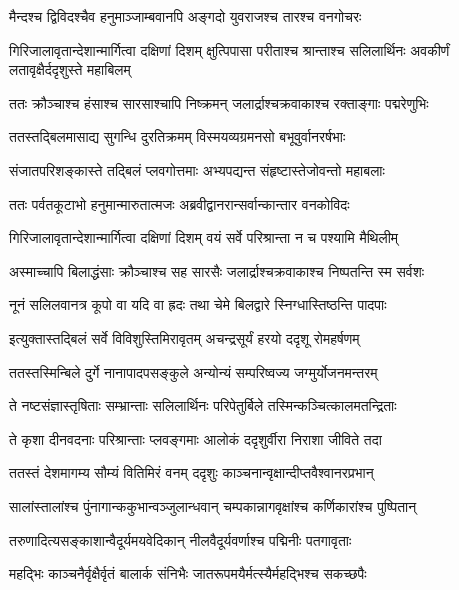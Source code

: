 \twolineshloka
{मैन्दश्च द्विविदश्चैव हनुमाञ्जाम्बवानपि}
{अङ्गदो युवराजश्च तारश्च वनगोचरः} %

\threelineshloka
{गिरिजालावृतान्देशान्मार्गित्वा दक्षिणां दिशम्}
{क्षुत्पिपासा परीताश्च श्रान्ताश्च सलिलार्थिनः}
{अवकीर्णं लतावृक्षैर्ददृशुस्ते महाबिलम्} %

\twolineshloka
{ततः क्रौञ्चाश्च हंसाश्च सारसाश्चापि निष्क्रमन्}
{जलार्द्राश्चक्रवाकाश्च रक्ताङ्गाः पद्मरेणुभिः} %

\twolineshloka
{ततस्तद्बिलमासाद्य सुगन्धि दुरतिक्रमम्}
{विस्मयव्यग्रमनसो बभूवुर्वानरर्षभाः} %

\twolineshloka
{संजातपरिशङ्कास्ते तद्बिलं प्लवगोत्तमाः}
{अभ्यपद्यन्त संहृष्टास्तेजोवन्तो महाबलाः} %

\twolineshloka
{ततः पर्वतकूटाभो हनुमान्मारुतात्मजः}
{अब्रवीद्वानरान्सर्वान्कान्तार वनकोविदः} %

\twolineshloka
{गिरिजालावृतान्देशान्मार्गित्वा दक्षिणां दिशम्}
{वयं सर्वे परिश्रान्ता न च पश्यामि मैथिलीम्} %

\twolineshloka
{अस्माच्चापि बिलाद्धंसाः क्रौञ्चाश्च सह सारसैः}
{जलार्द्राश्चक्रवाकाश्च निष्पतन्ति स्म सर्वशः} %

\twolineshloka
{नूनं सलिलवानत्र कूपो वा यदि वा ह्रदः}
{तथा चेमे बिलद्वारे स्निग्धास्तिष्ठन्ति पादपाः} %

\twolineshloka
{इत्युक्तास्तद्बिलं सर्वे विविशुस्तिमिरावृतम्}
{अचन्द्रसूर्यं हरयो ददृशू रोमहर्षणम्} %

\twolineshloka
{ततस्तस्मिन्बिले दुर्गे नानापादपसङ्कुले}
{अन्योन्यं सम्परिष्वज्य जग्मुर्योजनमन्तरम्} %

\twolineshloka
{ते नष्टसंज्ञास्तृषिताः सम्भ्रान्ताः सलिलार्थिनः}
{परिपेतुर्बिले तस्मिन्कञ्चित्कालमतन्द्रिताः} %

\twolineshloka
{ते कृशा दीनवदनाः परिश्रान्ताः प्लवङ्गमाः}
{आलोकं ददृशुर्वीरा निराशा जीविते तदा} %

\twolineshloka
{ततस्तं देशमागम्य सौम्यं वितिमिरं वनम्}
{ददृशुः काञ्चनान्वृक्षान्दीप्तवैश्वानरप्रभान्} %

\twolineshloka
{सालांस्तालांश्च पुंनागान्ककुभान्वञ्जुलान्धवान्}
{चम्पकान्नागवृक्षांश्च कर्णिकारांश्च पुष्पितान्} %

\twolineshloka
{तरुणादित्यसङ्काशान्वैदूर्यमयवेदिकान्}
{नीलवैदूर्यवर्णाश्च पद्मिनीः पतगावृताः} %

\twolineshloka
{महद्भिः काञ्चनैर्वृक्षैर्वृतं बालार्क संनिभैः}
{जातरूपमयैर्मत्स्यैर्महद्भिश्च सकच्छपैः} %

